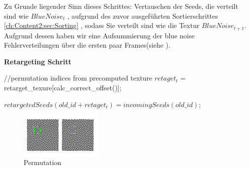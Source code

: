 Zu Grunde liegender Sinn dieses Schrittes: Vertauschen der Seeds, die 
verteilt sind wie $BlueNoise_{t}$ , aufgrund des zuvor ausgeführten Sortierschrittes \ref{ch:Content2:sec:Sorting}
, sodass Sie verteilt sind wie die Textur
$BlueNoise_{t+1}$. Aufgrund dessen haben wir eine Aufsummierung der
blue noise Fehlerverteilungen über die ersten paar Frames(siehe ).

\begin{algorithm}[H]
    \caption{\textbf{Retargeting Schritt}}
    \begin{algorithmic}[1]
        \State //permutation indices from precomputed texture
        \State $retaget_{t}$ = retarget\_texure[calc\_correct\_offset()];
        
        \State $retargetedSeeds(old\_id + retaget_{t}) = incomingSeeds(old\_id);$
        
    \end{algorithmic}
    \label{alg:retargetingAlg}
\end{algorithm}

\begin{figure}[H]\label{pic:Permutation}
    \centering
    \includegraphics[width=0.5\linewidth]{content/simulatedAnnealing/Bilder/Permutation.png}
    \caption{Permutation}
\end{figure}

